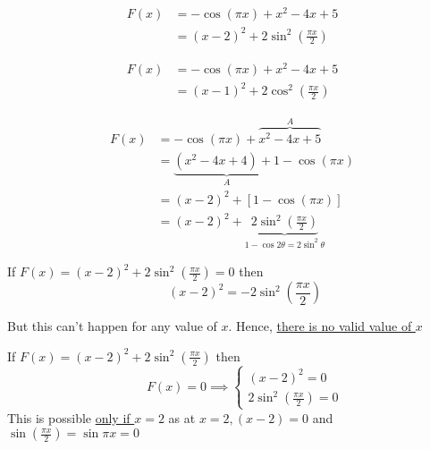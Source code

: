 \documentclass[14pt,fleqn]{extarticle}
\newcommand\expb{ \left(x-2 \right)^2 + 2\sin^2 \left(\frac{\pi x}{2} \right)}
\begin{document}
\begin{question}
\begin{step}
  \begin{options} 
     \correct 
       \begin{align}
	F(x) &= -\cos \left(\pi x \right) + x^2 - 4x + 5 \\
	&= \left(x-2 \right)^2 + 2\sin^2 \left(\frac{\pi x}{2} \right)
\end{align}

\incorrect 

 \begin{align}
	F(x) &= -\cos \left(\pi x \right) + x^2 - 4x + 5 \\
	&= \left(x-1 \right)^2 + 2\cos^2 \left(\frac{\pi x}{2} \right)
\end{align}
        
    \end{options} 
     \reason 
       
       \begin{align}
       F(x) &=  -\cos \left(\pi x \right) + \overbrace{x^2 - 4x + 5}^{A} \\
       &= \underbrace{\left(x^2-4x+4 \right) + 1}_{A} -\cos \left(\pi x \right) \\
       &= \left(x-2 \right)^2 + \left[1-\cos \left(\pi x \right) \right] \\
       &= \left(x-2 \right)^2 + \underbrace{2\sin^2 \left(\frac{\pi x}{2} \right)}_{1-\cos 2\theta = 2\sin^2\theta}
\end{align}
\end{step}

\begin{step}
  \begin{options} 
       
     \incorrect 
     
     If $F(x) = \expb = 0$ then 
     \[ \qquad \left(x-2 \right)^2 = - 2\sin^2 \left(\frac{\pi x}{2} \right)\]
       
     But this can't happen for any value of $x$. Hence, \underline{there is no valid value of $x$} 
    
    \end{options} 

 \reason
     
     If $F(x) = \expb$ then 
     \[ \qquad F(x) = 0 \implies \begin{cases} 
     \left(x-2 \right)^2 = 0 \\
     2\sin^2 \left(\frac{\pi x}{2} \right) = 0
     \end{cases} \]
     This is possible \underline{only if $x = 2$} as at $x=2, \left(x-2 \right)=0$ and $\sin \left(\frac{\pi x}{2} \right) = \sin \pi x = 0$ 
       
\end{step}
\end{question} 
\end{document}
